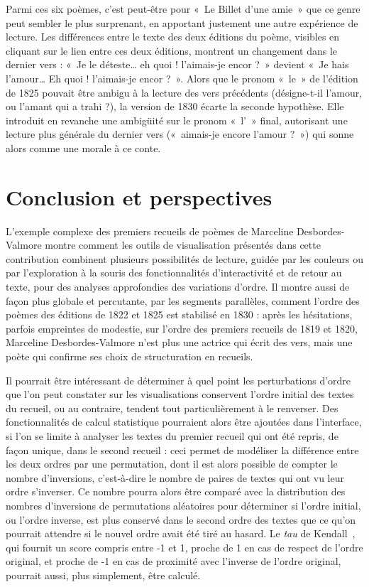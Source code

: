 \documentclass[final, fra]{anthology-ch}     %
\begin{document}
Parmi ces six poèmes, c'est peut-être pour «~Le Billet d'une amie~» que ce genre peut sembler le plus surprenant, en apportant justement une autre expérience de lecture. Les différences entre le texte des deux éditions du poème, visibles en cliquant sur le lien entre ces deux éditions, montrent un changement dans le dernier vers : «~Je le déteste{\ldots} eh quoi ! l’aimais-je encor ?~» devient «~Je hais l’amour{\ldots} Eh quoi ! l’aimais-je encor ?~». Alors que le pronom «~le~» de l'édition de 1825 pouvait être ambigu à la lecture des vers précédents (désigne-t-il l'amour, ou l'amant qui a trahi ?), la version de 1830 écarte la seconde hypothèse. Elle introduit en revanche une ambigüité sur le pronom «~l'~» final, autorisant une lecture plus générale du dernier vers («~aimais-je encore l'amour ?~») qui sonne alors comme une morale à ce conte.

\section{Conclusion et perspectives}

L'exemple complexe des premiers recueils de poèmes de Marceline Desbordes-Valmore montre comment les outils de visualisation présentés dans cette contribution combinent plusieurs possibilités de lecture, guidée par les couleurs ou par l'exploration à la souris des fonctionnalités d'interactivité et de retour au texte, pour des analyses approfondies des variations d'ordre. Il montre aussi de façon plus globale et percutante, par les segments parallèles, comment l'ordre des poèmes des éditions de 1822 et 1825 est stabilisé en 1830 : après les hésitations, parfois empreintes de modestie, sur l'ordre des premiers recueils de 1819 et 1820, Marceline Desbordes-Valmore n'est plus une actrice qui écrit des vers, mais une poète qui confirme ses choix de structuration en recueils.

Il pourrait être intéressant de déterminer à quel point les perturbations d'ordre que l'on peut constater sur les visualisations conservent l'ordre initial des textes du recueil, ou au contraire, tendent tout particulièrement à le renverser. Des fonctionnalités de calcul statistique pourraient alors être ajoutées dans l'interface, si l'on se limite à analyser les textes du premier recueil qui ont été repris, de façon unique, dans le second recueil : ceci permet de modéliser la différence entre les deux ordres par une permutation, dont il est alors possible de compter le nombre d'inversions, c'est-à-dire le nombre de paires de textes qui ont vu leur ordre s'inverser. Ce nombre pourra alors être comparé avec la distribution des nombres d'inversions de permutations aléatoires pour déterminer si l'ordre initial, ou l'ordre inverse, est plus conservé dans le second ordre des textes que ce qu'on pourrait attendre si le nouvel ordre avait été tiré au hasard. Le \emph{tau} de Kendall~\cite{Kendall1938}, qui fournit un score compris entre -1 et 1, proche de 1 en cas de respect de l'ordre original, et proche de -1 en cas de proximité avec l'inverse de l'ordre original, pourrait aussi, plus simplement, être calculé.
\end{document}
